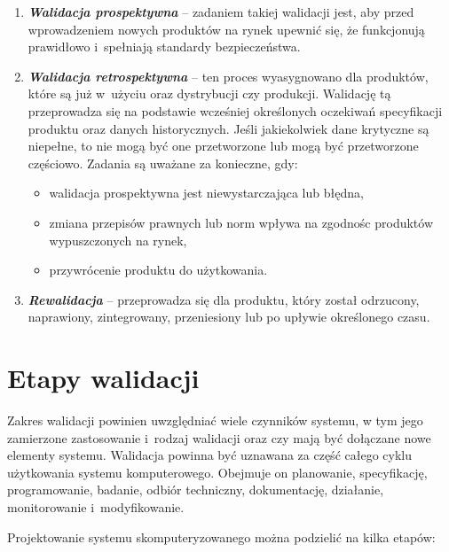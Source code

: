 \documentclass{xmgr}
\begin{document}
\begin{enumerate}
  \item \textbf{\textit{Walidacja prospektywna}} – zadaniem takiej walidacji jest, aby przed wprowadzeniem nowych produktów na rynek upewnić się, że funkcjonują prawidłowo i~spełniają standardy bezpieczeństwa.
  \item \textbf{\textit{Walidacja retrospektywna}} – ten proces wyasygnowano dla produktów, które są już w~użyciu oraz dystrybucji czy produkcji. Walidację tą przeprowadza się na podstawie wcześniej określonych oczekiwań specyfikacji produktu oraz danych historycznych. Jeśli jakiekolwiek dane krytyczne są niepełne, to nie mogą być one przetworzone lub mogą być przetworzone częściowo. Zadania są uważane za konieczne, gdy:
\begin{itemize}
\item walidacja prospektywna jest niewystarczająca lub błędna,
\item zmiana przepisów prawnych lub norm wpływa na zgodnośc produktów wypuszczonych na rynek,
\item przywrócenie produktu do użytkowania.
\end{itemize}
  \item \textbf{\textit{Rewalidacja}} – przeprowadza się dla produktu, który został odrzucony, naprawiony, zintegrowany, przeniesiony lub po upływie określonego czasu.\cite{Categories}
\end{enumerate}

\section{Etapy walidacji}
\indent \indent \indent Zakres walidacji powinien uwzględniać wiele czynników systemu, w tym jego zamierzone zastosowanie i~rodzaj walidacji oraz czy mają być dołączane nowe elementy systemu. Walidacja powinna być uznawana za część całego cyklu użytkowania systemu komputerowego. Obejmuje on planowanie, specyfikację, programowanie, badanie, odbiór techniczny, dokumentację, działanie, monitorowanie i~modyfikowanie.

Projektowanie systemu skomputeryzowanego można podzielić na kilka etapów:
\end{document}
